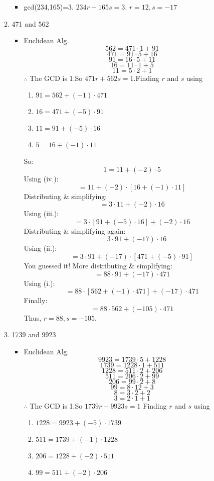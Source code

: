 \documentclass[12pt]{article}
\begin{document}
\begin{enumerate}
\begin{enumerate}
        \begin{itemize}
            \item gcd(234,165)=3. $234r+165s=3$. $r=12, s=-17$ 
        \end{itemize}
        \item 471 and 562
            \begin{itemize}
                \item Euclidean Alg.$$562=471\cdot1+91$$ $$471=91\cdot5+16$$ $$91=16\cdot5+11$$ $$16=11\cdot1+5$$ $$11=5\cdot2+1$$ $\therefore$ The GCD is 1.\newline So $471r+562s=1$.\newline Finding $r$ and $s$ using \begin{enumerate}
                \item $91=562+(-1)\cdot471$
                \item $16=471+(-5)\cdot91$
                \item $11=91+(-5)\cdot16$
                \item $5=16+(-1)\cdot11$
            \end{enumerate}
            So:$$1=11+(-2)\cdot5$$ Using (iv.):$$=11+(-2)\cdot[16+(-1)\cdot11]$$ Distributing \& simplifying:$$=3\cdot11+(-2)\cdot16$$ Using (iii.):$$=3\cdot[91+(-5)\cdot16]+(-2)\cdot16$$ Distributing \& simplifying again:$$=3\cdot91+(-17)\cdot16$$Using (ii.):$$=3\cdot91+(-17)\cdot[471+(-5)\cdot91]$$You guessed it! More distributing \& simplifying:$$=88\cdot91+(-17)\cdot471$$Using (i.):$$=88\cdot[562+(-1)\cdot471]+(-17)\cdot471$$Finally:$$=88\cdot562+(-105)\cdot471$$ Thus, $r=88, s=-105$.
            \end{itemize}
        \item 1739 and 9923
        \begin{itemize}
            \item Euclidean Alg.$$9923=1739\cdot5+1228$$ $$1739=1228\cdot1+511$$ $$1228=511\cdot2+206$$ $$511=206\cdot2+99$$ $$206=99\cdot2+8$$ $$99=8\cdot12+3$$ $$8=3\cdot2+2$$ $$3=2\cdot1+1$$ $\therefore$ The GCD is 1.\newline So $1739r+9923s=1$ \newpage Finding $r$ and $s$ using \begin{enumerate}
                \item $1228=9923+(-5)\cdot1739$
                \item $511=1739+(-1)\cdot1228$
                \item $206=1228+(-2)\cdot511$
                \item $99=511+(-2)\cdot206$

\end{enumerate}
\end{itemize}
\end{enumerate}
\end{enumerate}
\end{document}
